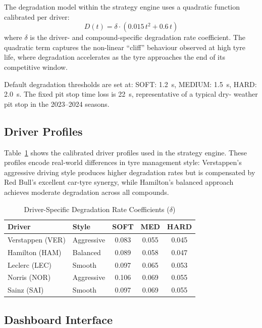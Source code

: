 \documentclass[journal,twoside]{IEEEtran}
\begin{document}
The degradation model within the strategy engine uses a quadratic
function calibrated per driver:
\begin{equation}
  D(t) = \delta \cdot (0.015\,t^2 + 0.6\,t)
  \label{eq:deg_model}
\end{equation}
where $\delta$ is the driver- and compound-specific degradation rate
coefficient.  The quadratic term captures the non-linear ``cliff''
behaviour observed at high tyre life, where degradation accelerates
as the tyre approaches the end of its competitive window.

Default degradation thresholds are set at: SOFT: \SI{1.2}{\second},
MEDIUM: \SI{1.5}{\second}, HARD: \SI{2.0}{\second}.  The fixed pit
stop time loss is \SI{22}{\second}, representative of a typical dry-
weather pit stop in the 2023--2024 seasons.

\subsection{Driver Profiles}

Table~\ref{tab:driver_profiles} shows the calibrated driver profiles
used in the strategy engine.  These profiles encode real-world
differences in tyre management style: Verstappen's aggressive driving
style produces higher degradation rates but is compensated by Red
Bull's excellent car-tyre synergy, while Hamilton's balanced approach
achieves moderate degradation across all compounds.

\begin{table}[!t]
\caption{Driver-Specific Degradation Rate Coefficients ($\delta$)}
\label{tab:driver_profiles}
\centering
\footnotesize
\begin{tabular}{@{}llccc@{}}
\toprule
\textbf{Driver} & \textbf{Style} & \textbf{SOFT} & \textbf{MED} & \textbf{HARD} \\
\midrule
Verstappen (VER)  & Aggressive & 0.083 & 0.055 & 0.045 \\
Hamilton (HAM)    & Balanced   & 0.089 & 0.058 & 0.047 \\
Leclerc (LEC)     & Smooth     & 0.097 & 0.065 & 0.053 \\
Norris (NOR)      & Aggressive & 0.106 & 0.069 & 0.055 \\
Sainz (SAI)       & Smooth     & 0.097 & 0.069 & 0.055 \\
\bottomrule
\end{tabular}
\end{table}

\subsection{Dashboard Interface}
\end{document}
